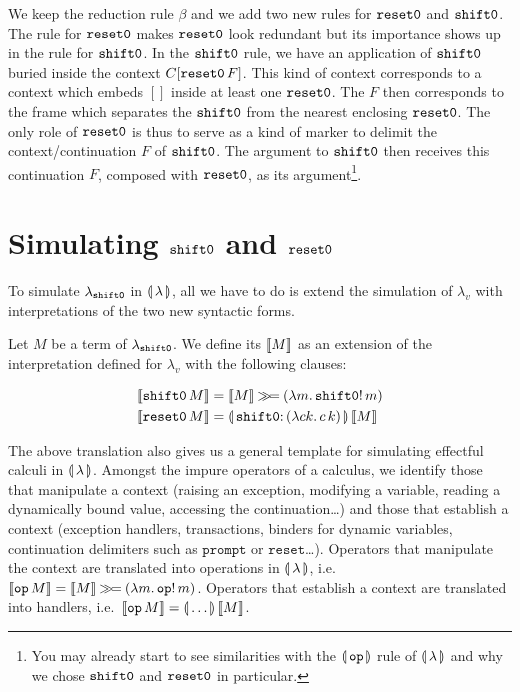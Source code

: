 We keep the reduction rule $\beta$ and we add two new rules for $\mathtt{reset0}$
and $\mathtt{shift0}$. The rule for $\mathtt{reset0}$ makes $\mathtt{reset0}$ look redundant but
its importance shows up in the rule for $\mathtt{shift0}$. In the $\mathtt{shift0}$ rule,
we have an application of $\mathtt{shift0}$ buried inside the context
$C[\mathtt{reset0}\,F]$. This kind of context corresponds to a context which
embeds $[]$ inside at least one $\mathtt{reset0}$. The $F$ then corresponds to the
frame which separates the $\mathtt{shift0}$ from the nearest enclosing
$\mathtt{reset0}$. The only role of $\mathtt{reset0}$ is thus to serve as a kind of marker
to delimit the context/continuation $F$ of $\mathtt{shift0}$. The argument to
$\mathtt{shift0}$ then receives this continuation $F$, composed with $\mathtt{reset0}$, as
its argument\footnote{You may already start to see similarities with the
  $\llparenthesis \, \mathtt{op} \, \rrparenthesis$ rule of $\llparenthesis \, \lambda \, \rrparenthesis$ and why we chose $\mathtt{shift0}$
  and $\mathtt{reset0}$ in particular.}.

\section{Simulating $\mathtt{shift0}$ and $\mathtt{reset0}$}

To simulate $\lambda_{\mathtt{shift0}}$ in $\llparenthesis \, \lambda \, \rrparenthesis$, all we have to do is
extend the simulation of $\lambda_v$ with interpretations of the two new
syntactic forms.

\begin{definition}
  Let $M$ be a term of $\lambda_{\mathtt{shift0}}$. We define its
   $\llbracket M \rrbracket$ as an extension of the interpretation
  defined for $\lambda_v$ with the following clauses:

\begin{align*}
  \sem{\ap{\shifto}{M}} &= \sem{M} \hsbind (\lam{m}{\ap{\op{shift0}!}{m}}) \\
  \sem{\ap{\reseto}{M}} &= \ap{\resetobanana}{\sem{M}}
\end{align*}
\end{definition}

The above translation also gives us a general template for simulating
effectful calculi in $\llparenthesis \, \lambda \, \rrparenthesis$. Amongst the impure operators of a
calculus, we identify those that manipulate a context (raising an
exception, modifying a variable, reading a dynamically bound value,
accessing the continuation\ldots) and those that establish a context
(exception handlers, transactions, binders for dynamic variables,
continuation delimiters such as $\texttt{prompt}$ or
$\texttt{reset}$\ldots). Operators that manipulate the context are
translated into operations in $\llparenthesis \, \lambda \, \rrparenthesis$,
i.e.\ $\llbracket \texttt{op}\,M \rrbracket = \llbracket M \rrbracket \mathbin{\gg\!=}
(\lambda m.\, \mathtt{op}!\,m)$. Operators that establish a context are
translated into handlers, i.e.\ $\llbracket \texttt{op}\,M \rrbracket =
\llparenthesis \, \ldots \, \rrparenthesis\,\llbracket M \rrbracket$.


